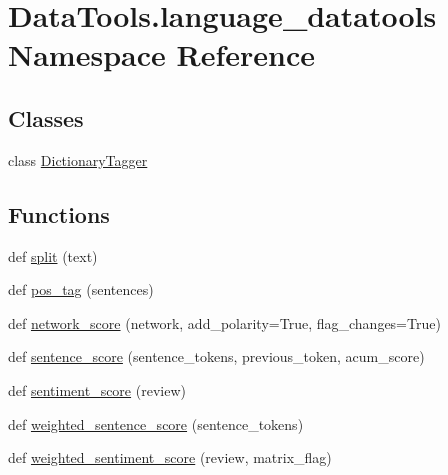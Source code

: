 \hypertarget{namespace_data_tools_1_1language__datatools}{}\section{Data\+Tools.\+language\+\_\+datatools Namespace Reference}
\label{namespace_data_tools_1_1language__datatools}
\subsection*{Classes}
\begin{DoxyCompactItemize}
\item 
class \mbox{\hyperlink{class_data_tools_1_1language__datatools_1_1_dictionary_tagger}{Dictionary\+Tagger}}
\end{DoxyCompactItemize}
\subsection*{Functions}
\begin{DoxyCompactItemize}
\item 
def \mbox{\hyperlink{namespace_data_tools_1_1language__datatools_afe62d5ebd637d46169960a826c034ef5}{split}} (text)
\item 
def \mbox{\hyperlink{namespace_data_tools_1_1language__datatools_a32400bed4e58a49b11ac2d4e6a2e5462}{pos\+\_\+tag}} (sentences)
\item 
def \mbox{\hyperlink{namespace_data_tools_1_1language__datatools_a5e5c053b4f7d96f05116951b03a214e0}{network\+\_\+score}} (network, add\+\_\+polarity=True, flag\+\_\+changes=True)
\item 
def \mbox{\hyperlink{namespace_data_tools_1_1language__datatools_abe2e77093c7288b7daf9baa62399f77b}{sentence\+\_\+score}} (sentence\+\_\+tokens, previous\+\_\+token, acum\+\_\+score)
\item 
def \mbox{\hyperlink{namespace_data_tools_1_1language__datatools_a18ef589c882e116d6547b6e5919e3a3a}{sentiment\+\_\+score}} (review)
\item 
def \mbox{\hyperlink{namespace_data_tools_1_1language__datatools_a4d48db81c591efbde6b9b4f57764954c}{weighted\+\_\+sentence\+\_\+score}} (sentence\+\_\+tokens)
\item 
def \mbox{\hyperlink{namespace_data_tools_1_1language__datatools_a458225ca6e39d79be8054fe60000bf77}{weighted\+\_\+sentiment\+\_\+score}} (review, matrix\+\_\+flag)
\end{DoxyCompactItemize}


